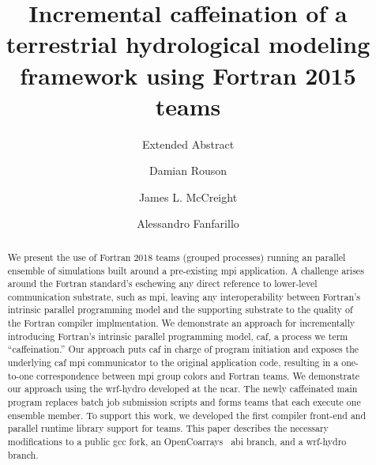 \documentclass[sigconf, authordraft]{acmart}
\begin{document}
\title{Incremental caffeination of a terrestrial hydrological modeling framework using Fortran 2015 teams}
\subtitle{Extended Abstract}


\author{Damian Rouson}
\renewcommand{\shortauthors}{D. Rouson et al.}

\author{James L. McCreight}

\author{Alessandro Fanfarillo}

\begin{abstract}
We present the use of Fortran 2018 teams (grouped processes) running an parallel ensemble
of simulations built around a pre-existing \gls{mpi} application.  A challenge arises
around the Fortran standard's eschewing any direct reference to lower-level communication
substrate, such as \gls{mpi}, leaving any interoperability between Fortran's intrinsic
parallel programming model and the supporting substrate to the quality of the Fortran
compiler implmentation.  We demonstrate an approach for incrementally introducing
Fortran's intrinsic parallel programming model, \gls{caf}, a process we term
``caffeination.''  Our approach puts \gls{caf} in charge of program initiation and
exposes the underlying \gls{caf} \gls{mpi} communicator to the original application
code,  resulting in a one-to-one correspondence between \gls{mpi} group colors and Fortran
teams.  We demonstrate our approach using the \gls{wrf-hydro} developed at the \gls{ncar}.
The newly caffeinated main program replaces batch job submission scripts and forms teams
that each execute one ensemble member.  To support this work, we developed the first
compiler front-end and parallel runtime library support for teams.  This paper describes
the necessary modifications to a public \gls{gcc} fork, an
OpenCoarrays~\cite{fanfarillo2014opencoarrays} \gls{abi} branch, and a \gls{wrf-hydro}
branch.
\end{abstract}
\end{document}

